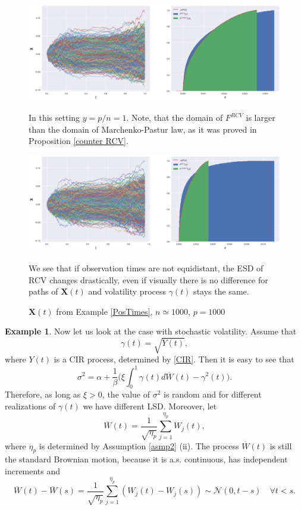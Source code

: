 \documentclass[a4paper,11pt]{book}
\theoremstyle{plain}
\theoremstyle{definition}
\newtheorem{exmp}[thm]{Example}
\begin{document}
    \begin{figure}
    	\begin{center} \centering
    		\includegraphics[scale=0.4]{XCos}
    		\caption{ $\mathbf{X}(t)$ from Example \ref{SimCos}, $n = 1000$, $p=1000$ }
    		\smallskip
    		\small
    		In this setting $y = p/n = 1$. Note, that the domain of $F^{RCV}$ is larger than the domain of Marchenko-Pastur law, as it was proved in Proposition \ref{counter RCV}.
    	\end{center}
    	\begin{center} \centering
    		\includegraphics[scale=0.4]{Xcostimes}
    		\caption{ $\mathbf{X}(t)$ from Example \ref{PosTimes}, $n \simeq 1000$, $p=1000$ }
    		\smallskip
    		\small
    		We see that if observation times are not equidistant, the ESD of RCV changes drastically, even if visually there is no difference for paths of $\mathbf{X}(t)$ and volatility process $\gamma(t)$ stays the same.
    	\end{center}
    \end{figure}
    
    \begin{exmp} \label{SimCIR}
    	Now let us look at the case with stochastic volatility. Assume that
    	\[ \gamma(t) = \sqrt{Y(t)}, \]
    	where $Y(t)$ is a CIR process, determined by \eqref{CIR}. Then it is easy to see that
    	\[ \sigma^2 = \alpha + \frac{1}{\beta} \Big(\xi \int_{0}^{1} \gamma(t) d\overline{W}(t) - \gamma^2(t)\Big). \] 
    	Therefore, as long as $\xi > 0$, the value of $\sigma^2$ is random and for different realizations of $\gamma(t)$ we have different LSD.
    	Moreover, let
    	\[ \overline{W}(t) = \frac{1}{\sqrt{\eta_p}} \sum_{j=1}^{\eta_p}W_j(t), \]
    	where $\eta_p$ is determined by Assumption \ref{asmp2} (ii). The process $\overline{W}(t)$ is still the standard Brownian motion, because it is a.s. continuous, has independent increments and
    	\[ \overline{W}(t) - \overline{W}(s) = \frac{1}{\sqrt{\eta_p}} \sum_{j=1}^{\eta_p}(W_j(t)-W_j(s)) \sim \mathcal{N}(0, t-s) \quad \forall t < s. \]
    \end{exmp}
    
\end{document}
